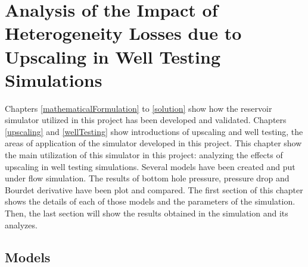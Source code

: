 \chapter{Analysis of the Impact of Heterogeneity Losses due to Upscaling in Well Testing Simulations}

Chapters \ref{mathematicalFormulation} to \ref{solution} show how the reservoir simulator utilized in this project has been developed and validated. Chapters \ref{upscaling} and \ref{wellTesting} show introductions of upscaling and well testing, the areas of application of the simulator developed in this project. This chapter show the main utilization of this simulator in this project: analyzing the effects of upscaling in well testing simulations. Several models have been created and put under flow simulation. The results of bottom hole pressure, pressure drop and Bourdet derivative have been plot and compared. The first section of this chapter shows the details of each of those models and the parameters of the simulation. Then, the last section will show the results obtained in the simulation and its analyzes.

\section{Models}

